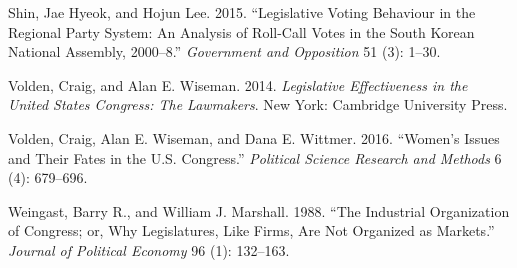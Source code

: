 \documentclass[11pt]{article}
\begin{document}
\begin{description}
\item Shin, Jae Hyeok, and Hojun Lee. 2015. ``Legislative Voting Behaviour in the Regional Party System: An Analysis of Roll-Call Votes in the South Korean National Assembly, 2000--8.'' \textit{Government and Opposition} 51 (3): 1--30.

\item Volden, Craig, and Alan E. Wiseman. 2014. \textit{Legislative Effectiveness in the United States Congress: The Lawmakers}. New York: Cambridge University Press.

\item Volden, Craig, Alan E. Wiseman, and Dana E. Wittmer. 2016. ``Women's Issues and Their Fates in the U.S. Congress.'' \textit{Political Science Research and Methods} 6 (4): 679--696.

\item Weingast, Barry R., and William J. Marshall. 1988. ``The Industrial Organization of Congress; or, Why Legislatures, Like Firms, Are Not Organized as Markets.'' \textit{Journal of Political Economy} 96 (1): 132--163.

\end{description}
\end{document}

